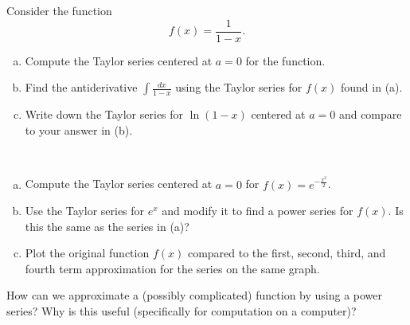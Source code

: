 \documentclass[12pt]{article} %
\begin{document}
\begin{problem} Consider the function
\[
f(x)=\frac{1}{1-x}.
\]
\begin{enumerate}[(a)]
    \item Compute the Taylor series centered at $a=0$ for the function.
    \item Find the antiderivative $\int \frac{dx}{1-x}$ using the Taylor series for $f(x)$ found in (a).  
    \item Write down the Taylor series for $\ln(1-x)$ centered at $a=0$ and compare to your answer in (b).
\end{enumerate}
\end{problem}

\begin{problem}~
\begin{enumerate}[(a)]
    \item Compute the Taylor series centered at $a=0$ for $f(x)=e^{-\frac{x^2}{2}}$.
    \item Use the Taylor series for $e^x$ and modify it to find a power series for $f(x)$. Is this the same as the series in (a)?
    \item Plot the original function $f(x)$ compared to the first, second, third, and fourth term approximation for the series on the same graph.
\end{enumerate}
\end{problem}

\begin{problem}
How can we approximate a (possibly complicated) function by using a power series? Why is this useful (specifically for computation on a computer)?
\end{problem}
\end{document}
